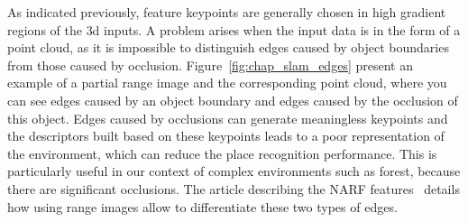 As indicated previously, feature keypoints are generally chosen in high gradient regions of the \gls*{3d} inputs. A problem arises when the input data is in the form of a point cloud, as it is impossible to distinguish edges caused by object boundaries from those caused by occlusion. Figure~\ref{fig:chap_slam_edges} present an example of a partial range image and the corresponding point cloud, where you can see edges caused by an object boundary and edges caused by the occlusion of this object. Edges caused by occlusions can generate meaningless keypoints and the descriptors built based on these keypoints leads to a poor representation of the environment, which can reduce the place recognition performance. This is particularly useful in our context of complex environments such as forest, because there are significant occlusions. The article describing the NARF features~\citep{Steder2011a} details how using range images allow to differentiate these two types of edges.

